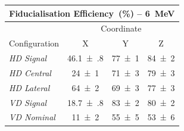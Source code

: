 \begin{tabular}{lccc}
    \multicolumn{4}{c}{Fiducialisation Efficiency~(\%) -- \SI{6}{\mega\electronvolt}}\\
    \toprule
    & \multicolumn{3}{c}{Coordinate}\\
    Configuration & X & Y & Z\\
    \midrule
    \emph{HD Signal} & \num{46.1(8)} & \num{77(1)} & \num{84(2)} \\
    \emph{HD Central} & \num{24(1)} & \num{71(3)} & \num{79(3)} \\
    \emph{HD Lateral} & \num{64(2)} & \num{69(3)} & \num{77(3)} \\
    \emph{VD Signal} & \num{18.7(8)} & \num{83(2)} & \num{80(2)} \\
    \emph{VD Nominal} & \num{11(2)} & \num{55(5)} & \num{53(6)} \\
    \bottomrule
\end{tabular}